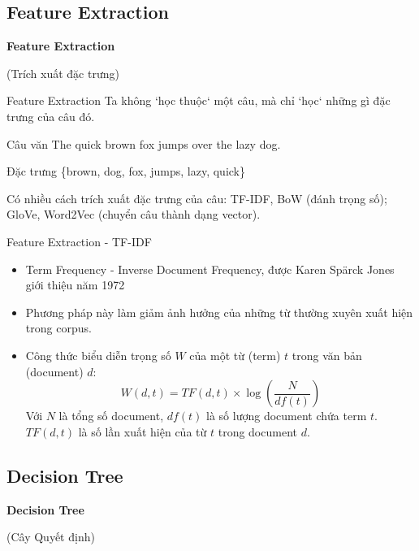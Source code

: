 \documentclass[aspectratio=169,xcolor=dvipsnames]{beamer}
\begin{document}
\subsection{Feature Extraction}

\begin{frame}
	\Huge{\centerline{\textbf{Feature Extraction}}}
	\centerline{(Trích xuất đặc trưng)}
\end{frame}

\begin{frame}{Feature Extraction}
Ta không `học thuộc` một câu, mà chỉ `học` những gì đặc trưng của câu đó.
\begin{block}{Câu văn}
The quick brown fox jumps over the lazy dog.
\end{block}

\begin{block}{Đặc trưng}
	\{brown, dog, fox, jumps, lazy, quick\}
\end{block}

Có nhiều cách trích xuất đặc trưng của câu: TF-IDF, BoW (đánh trọng số); GloVe, Word2Vec (chuyển câu thành dạng vector).
\end{frame}

\begin{frame}{Feature Extraction - TF-IDF}
\begin{itemize}
\item Term Frequency - Inverse Document Frequency, được  Karen Spärck Jones giới thiệu năm 1972\cite{Jones72astatistical}
\item Phương pháp này làm giảm ảnh hưởng của những từ thường xuyên xuất hiện trong corpus.
\item Công thức biểu diễn trọng số $W$ của một từ (term) $t$ trong văn bản (document) $d$:
$$
W(d, t) = TF(d, t) \times \log\left(\frac{N}{df(t)}\right)
$$
Với $N$ là tổng số document, $df(t)$ là số lượng document chứa term $t$. $TF(d, t)$ là số lần xuất hiện của từ $t$ trong document $d$.
\end{itemize}
\end{frame}

\subsection{Decision Tree}

\begin{frame}
	\Huge{\centerline{\textbf{Decision Tree}}}
	{\centerline{(Cây Quyết định)}}
\end{frame}
\end{document}
